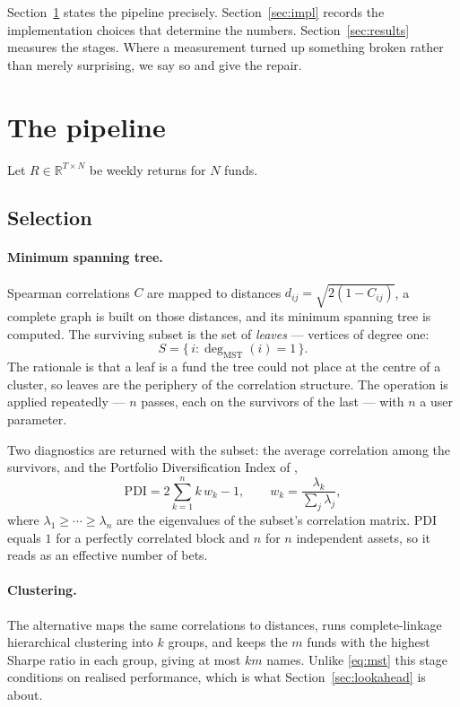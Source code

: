 \documentclass[11pt,a4paper]{article}
\begin{document}
Section~\ref{sec:method} states the pipeline precisely.
Section~\ref{sec:impl} records the implementation choices that determine the
numbers. Section~\ref{sec:results} measures the stages. Where a measurement
turned up something broken rather than merely surprising, we say so and give
the repair.

\section{The pipeline}
\label{sec:method}

Let $R \in \mathbb{R}^{T \times N}$ be weekly returns for $N$ funds.

\subsection{Selection}

\paragraph{Minimum spanning tree.}
Spearman correlations $C$ are mapped to distances
$d_{ij} = \sqrt{2(1 - C_{ij})}$, a complete graph is built on those distances,
and its minimum spanning tree \citep{kruskal1956} is computed. The surviving
subset is the set of \emph{leaves} --- vertices of degree one:
\begin{equation}
  S = \{\, i : \deg_{\mathrm{MST}}(i) = 1 \,\}.
  \label{eq:mst}
\end{equation}
The rationale is that a leaf is a fund the tree could not place at the centre
of a cluster, so leaves are the periphery of the correlation structure. The
operation is applied repeatedly --- $n$ passes, each on the survivors of the
last --- with $n$ a user parameter.

Two diagnostics are returned with the subset: the average correlation among the
survivors, and the Portfolio Diversification Index of \citet{rudin2006},
\begin{equation}
  \mathrm{PDI} = 2 \sum_{k=1}^{n} k \, w_k - 1,
  \qquad
  w_k = \frac{\lambda_k}{\sum_j \lambda_j},
  \label{eq:pdi}
\end{equation}
where $\lambda_1 \geq \cdots \geq \lambda_n$ are the eigenvalues of the
subset's correlation matrix. PDI equals $1$ for a perfectly correlated block
and $n$ for $n$ independent assets, so it reads as an effective number of bets.

\paragraph{Clustering.}
The alternative maps the same correlations to distances, runs complete-linkage
hierarchical clustering into $k$ groups, and keeps the $m$ funds with the
highest Sharpe ratio in each group, giving at most $km$ names. Unlike
\eqref{eq:mst} this stage conditions on realised performance, which is what
Section~\ref{sec:lookahead} is about.
\end{document}
